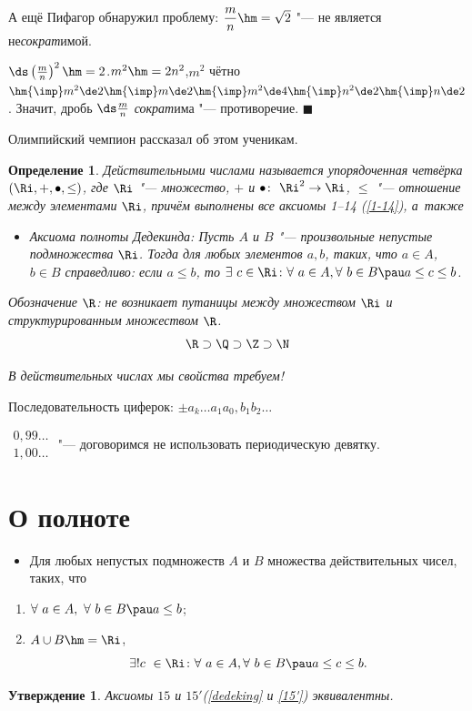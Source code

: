 \documentclass[a4paper,10pt,twoside]{article}
\newtheorem{Def}{Определение}[section]
\newtheorem{Ut}{Утверждение}[section]
\newenvironment{Proof}
       {\par\noindent{\textbf{Доказательство.}}}
       {\hfill$\scriptstyle\blacksquare$}
\let\AVsection\section{}
\renewcommand\section{\newpage\scol\AVsection}
\newcommand{\scol}{  \renewcommand{\headrulewidth}{0.5pt}\fancyhead[RE,LO]{\thesection{} \leftmark} \fancyhead[LE,RO]{\thepage}}
\begin{document}
А ещё Пифагор обнаружил проблему: $\dfrac mn\hm=\sqrt2$ "--- не является не\textit{сократ}имой.

\begin{Proof}
$\ds\left(\frac mn\right)^2\hm=2$.\pau $m^2\hm=2n^2$,\pau $m^2$ чётно $\hm{\imp}m^2\de 2\hm{\imp} m\de 2\hm{\imp} m^2\de4\hm{\imp} n^2\de2\hm{\imp} n\de2$.
Значит, дробь
$\ds\frac mn $ \textit{сократ}има "--- противоречие.
\end{Proof}

Олимпийский чемпион рассказал об этом ученикам.
\begin{Def}
Действительными числами называется упорядоченная четвёрка $(\Ri,+,\bullet,\leq)$, где $\Ri$ "--- множество,
 $+$ и $\bullet\colon\ \Ri^2\to\Ri$, $\leq$ "--- отношение между элементами $\Ri$, причём выполнены все аксиомы 1--14 (\ref{1-14}), а~также
\begin{itemize}\item[15.]\label{dedeking} Аксиома полноты Дедекинда: Пусть $A$ и $B$ "--- произвольные непустые подмножества $\Ri$.
 Тогда для любых элементов $a,b$, таких, что $a\in A$, $b\in B$ справедливо: если $a\leq b$, то $\exists\  c\in \Ri\colon\forall\  a\in A,\forall\  b\in B\pau a\leq c\leq b$.\end{itemize}

 Обозначение $\R$: не возникает путаницы между множеством $\Ri$ и структурированным множеством $\R$.
 \[
    \R\supset\Q\supset\Z\supset\N
 \]

В действительных числах мы свойства требуем!
\end{Def}

Последовательность циферок: $\pm a_k\ldots a_1a_0,b_1b_2\ldots$

$\begin{matrix}
0{,}99\ldots\\1{,}00\ldots
\end{matrix}$ "--- договоримся не использовать периодическую девятку.

\section{О полноте}
\begin{itemize}
\item[$15'$.]\label{15'} Для любых непустых подмножеств $A$ и $B$ множества действительных чисел, таких, что
\end{itemize}
\begin{enumerate}
\item $\forall\  a\in A,\ \forall\  b\in B\pau a\leq b$;
\item $A\cup B\hm=\Ri$,
\[\exists! c\ \in \Ri\colon\forall\  a\in A,\forall\  b\in B\pau a\leq c\leq b.\]
\end{enumerate}
\begin{Ut}
Аксиомы $15$ и $15'$(\ref{dedeking} и \ref{15'}) эквивалентны.
\end{Ut}
\end{document}

